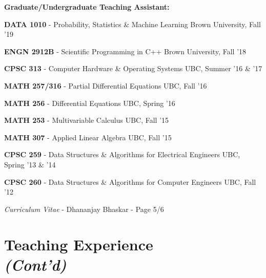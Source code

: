 \documentclass[margin,line]{res}
\newenvironment{list1}{
  \begin{list}{\ding{113}}{
      \setlength{\itemsep}{0in}
      \setlength{\parsep}{0in} \setlength{\parskip}{0in}
      \setlength{\topsep}{0in} \setlength{\partopsep}{0in}
      \setlength{\leftmargin}{0.17in}}}{\end{list}}
\begin{document}
\begin{resume}

\textbf{Graduate/Undergraduate Teaching Assistant:}
\vspace*{.2cm}

\begin{list1}
\setlength\itemsep{0.25em}
\item[] {\bf DATA 1010} - Probability, Statistics \& Machine Learning \hfill Brown University, Fall '19
\item[] {\bf ENGN 2912B} - Scientific Programming in C++ \hfill Brown University, Fall '18
\item[] {\bf CPSC 313} - Computer Hardware \& Operating Systems \hfill UBC, Summer '16 \& '17
\item[] {\bf MATH 257/316} - Partial Differential Equations \hfill UBC, Fall '16
\item[] {\bf MATH 256} - Differential Equations \hfill UBC, Spring '16
\item[] {\bf MATH 253} - Multivariable Calculus \hfill UBC, Fall '15
\item[] {\bf MATH 307} - Applied Linear Algebra \hfill UBC, Fall '15
\item[] {\bf CPSC 259} - Data Structures \& Algorithms for Electrical Engineers \hfill UBC, Spring '13 \& '14
\item[] {\bf CPSC 260} - Data Structures \& Algorithms for Computer Engineers \hfill UBC, Fall '12
\end{list1}

\newpage
\begin{flushright}
\textit{Curriculum Vitae} - Dhananjay Bhaskar - Page 5/6
\end{flushright}
\vspace*{.1cm}

\section{\sc Teaching Experience\\\textit{(Cont'd)}}


\end{resume}
\end{document}
